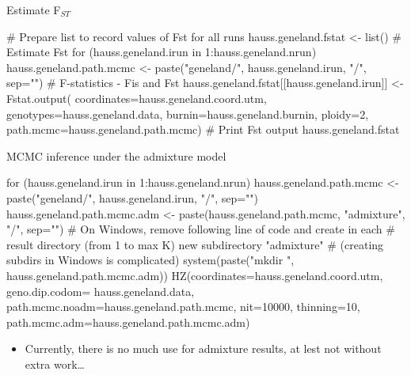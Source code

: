 \documentclass[compress, ucs, xelatex, 11pt, xcolor=svgnames,
  hyperref={
    bookmarks=true,
    unicode=true,
    colorlinks=true,
    pdftitle={Molecular data in R},
    plainpages=false,
    pdfauthor={Vojtech Zeisek},
    pdfsubject={Course about phylogeny and evolution in R},
    pdfcreator={XeLaTeX},
    pdfkeywords={R, evolution, phylogeny, molecular data},
    linkcolor=Tomato,
    anchorcolor=SaddleBrown,
    citecolor=Goldenrod,
    filecolor=DarkMagenta,
    menucolor=Sienna,
    urlcolor=DarkTurquoise,
    pdftex},
  url={hyphens, lowtilde} %
  ]{beamer}
\begin{document}
\begin{frame}[fragile]{Estimate F$_{ST}$}
  \begin{spluscode}
    # Prepare list to record values of Fst for all runs
    hauss.geneland.fstat <- list()
    # Estimate Fst
    for (hauss.geneland.irun in 1:hauss.geneland.nrun) {
      hauss.geneland.path.mcmc <- paste("geneland/",
      hauss.geneland.irun, "/", sep="")
      # F-statistics - Fis and Fst
      hauss.geneland.fstat[[hauss.geneland.irun]] <- Fstat.output(
        coordinates=hauss.geneland.coord.utm,
        genotypes=hauss.geneland.data,
        burnin=hauss.geneland.burnin, ploidy=2,
        path.mcmc=hauss.geneland.path.mcmc)
      }
      # Print Fst output
      hauss.geneland.fstat
  \end{spluscode}
\end{frame}

\begin{frame}[fragile]{MCMC inference under the admixture model}
  \begin{spluscode}
    for (hauss.geneland.irun in 1:hauss.geneland.nrun) {
      hauss.geneland.path.mcmc <- paste("geneland/",
        hauss.geneland.irun, "/", sep="")
      hauss.geneland.path.mcmc.adm <- paste(hauss.geneland.path.mcmc,
        "admixture", "/", sep="")
      # On Windows, remove following line of code and create in each
      # result directory (from 1 to max K) new subdirectory "admixture"
      # (creating subdirs in Windows is complicated)
      system(paste("mkdir ", hauss.geneland.path.mcmc.adm))
      HZ(coordinates=hauss.geneland.coord.utm, geno.dip.codom=
        hauss.geneland.data, path.mcmc.noadm=hauss.geneland.path.mcmc,
        nit=10000, thinning=10,
        path.mcmc.adm=hauss.geneland.path.mcmc.adm)
      }
  \end{spluscode}
  \begin{itemize}
    \item Currently, there is no much use for admixture results, at lest not without extra work\ldots
  \end{itemize}
\end{frame}
\end{document}
